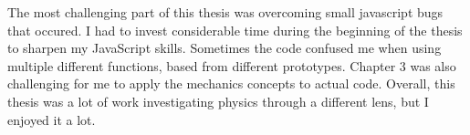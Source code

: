 The most challenging part of this thesis was overcoming small javascript bugs that occured.  I had to invest considerable time during the beginning of the thesis to sharpen my JavaScript skills.  Sometimes the code confused me when using multiple different functions, based from different prototypes.  Chapter 3 was also challenging for me to apply the mechanics concepts to actual code.  Overall, this thesis was a lot of work investigating physics through a different lens, but I enjoyed it a lot.


































